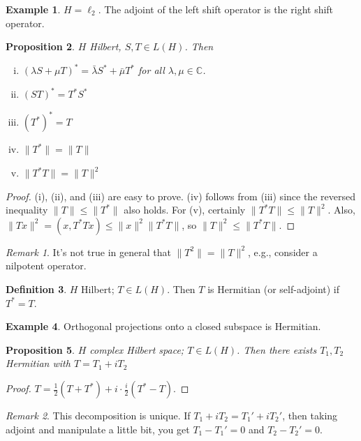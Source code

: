 \documentclass{article}
\theoremstyle{definition}
\newtheorem{defn}{Definition}[section]
\newtheorem{example}[defn]{Example}
\theoremstyle{remark}
\newtheorem{rem}{Remark}
\theoremstyle{plain}
\newtheorem{prop}[defn]{Proposition}
\newcommand{\CC}{\mathbb{C}}
\begin{document}
\begin{example}
    $H=\ell_2$. The adjoint of the left shift operator is the right shift operator.
\end{example}
\begin{prop}
    $H$ Hilbert, $S,T\in L(H)$. Then
    \begin{enumerate}[(i)]
        \item $(\lambda S+\mu T)^\ast =\bar \lambda S^\ast+\bar\mu T^\ast$ for all $\lambda,\mu\in\CC$.
        \item $(ST)^\ast=T^\ast S^\ast$
        \item $(T^\ast)^\ast= T$
        \item $\|T^\ast\|=\|T\|$
        \item $\|T^\ast T\|=\|T\|^2$
    \end{enumerate}
\end{prop}
\begin{proof}
    (i), (ii), and (iii) are easy to prove. (iv) follows from (iii) since the reversed inequality $\|T\|\le \|T^\ast\|$ also holds. For (v), certainly $\|T^\ast T\|\le \|T\|^2$. Also, $\|Tx\|^2=(x,T^\ast T x)\le \|x\|^2\|T^\ast T\|$, so $\|T\|^2\le \|T^\ast T\|$.
\end{proof}
\begin{rem}
    It's not true in general that $\|T^2\|=\|T\|^2$, e.g., consider a nilpotent operator.
\end{rem}
\begin{defn}
    $H$ Hilbert; $T\in L(H)$. Then $T$ is Hermitian (or self-adjoint) if $T^\ast =T$.
\end{defn}
\begin{example}
    Orthogonal projections onto a closed subspace is Hermitian.
\end{example}
\begin{prop}
    $H$ complex Hilbert space; $T\in L(H)$. Then there exists $T_1,T_2$ Hermitian with $T=T_1+iT_2$
\end{prop}
\begin{proof}
    $T=\frac12(T+T^\ast)+i\cdot\frac i2(T^\ast -T)$.
\end{proof}
\begin{rem}
    This decomposition is unique. If $T_1+iT_2=T_1'+iT_2'$, then taking adjoint and manipulate a little bit, you get $T_1-T_1'=0$ and $T_2-T_2'=0$.
\end{rem}
\end{document}
